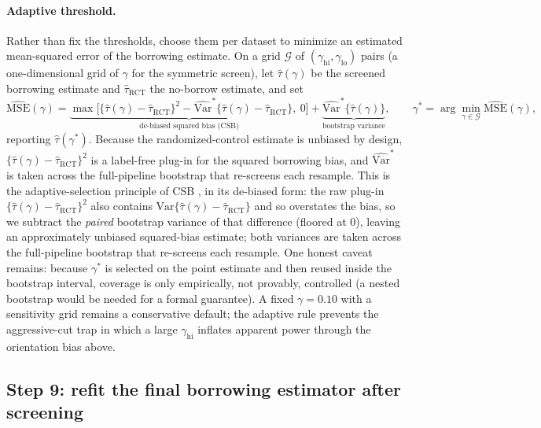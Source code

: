 \documentclass[11pt]{article}
\begin{document}
\paragraph{Adaptive threshold.} Rather than fix the thresholds, choose them per dataset to minimize an estimated mean-squared error of the borrowing estimate. On a grid $\mathcal G$ of $(\gamma_{\mathrm{hi}},\gamma_{\mathrm{lo}})$ pairs (a one-dimensional grid of $\gamma$ for the symmetric screen), let $\widehat\tau(\gamma)$ be the screened borrowing estimate and $\widehat\tau_{\mathrm{RCT}}$ the no-borrow estimate, and set
\[
\widehat{\mathrm{MSE}}(\gamma)
=
\underbrace{\max\!\bigl[\bigl\{\widehat\tau(\gamma)-\widehat\tau_{\mathrm{RCT}}\bigr\}^2-\widehat{\mathrm{Var}}^{\ast}\!\bigl\{\widehat\tau(\gamma)-\widehat\tau_{\mathrm{RCT}}\bigr\},\ 0\bigr]}_{\text{de-biased squared bias (CSB)}}
+
\underbrace{\widehat{\mathrm{Var}}^{\ast}\bigl\{\widehat\tau(\gamma)\bigr\}}_{\text{bootstrap variance}},
\qquad
\gamma^{\ast}=\arg\min_{\gamma\in\mathcal G}\widehat{\mathrm{MSE}}(\gamma),
\]
reporting $\widehat\tau(\gamma^{\ast})$. Because the randomized-control estimate is unbiased by design, $\{\widehat\tau(\gamma)-\widehat\tau_{\mathrm{RCT}}\}^2$ is a label-free plug-in for the squared borrowing bias, and $\widehat{\mathrm{Var}}^{\ast}$ is taken across the full-pipeline bootstrap that re-screens each resample. This is the adaptive-selection principle of CSB \citep{zhu2025csb}, in its de-biased form: the raw plug-in $\{\widehat\tau(\gamma)-\widehat\tau_{\mathrm{RCT}}\}^2$ also contains $\mathrm{Var}\{\widehat\tau(\gamma)-\widehat\tau_{\mathrm{RCT}}\}$ and so overstates the bias, so we subtract the \emph{paired} bootstrap variance of that difference (floored at $0$), leaving an approximately unbiased squared-bias estimate; both variances are taken across the full-pipeline bootstrap that re-screens each resample. One honest caveat remains: because $\gamma^{\ast}$ is selected on the point estimate and then reused inside the bootstrap interval, coverage is only empirically, not provably, controlled (a nested bootstrap would be needed for a formal guarantee). A fixed $\gamma=0.10$ with a sensitivity grid remains a conservative default; the adaptive rule prevents the aggressive-cut trap in which a large $\gamma_{\mathrm{hi}}$ inflates apparent power through the orientation bias above.

\subsection{Step 9: refit the final borrowing estimator after screening}\label{sec:refit}
\end{document}
